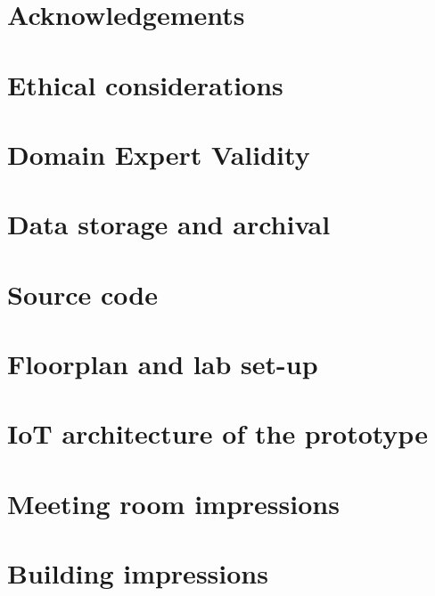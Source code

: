 \onecolumn

\appendix
\begin{appendices}

\section{Acknowledgements}
\label{appendix:acknowledgements}

\section{Ethical considerations}
\label{appendix:ethical}

\section{Domain Expert Validity}
\label{appendix:experts}

\section{Data storage and archival}
\label{appendix:data}

\section{Source code}
\label{appendix:source}

\section{Floorplan and lab set-up}
\label{appendix:floorplan}

\section{IoT architecture of the prototype}
\label{appendix:architecture}

\section{Meeting room impressions}
\label{appendix:meetings}

\section{Building impressions}
\label{appendix:building}


\end{appendices}
